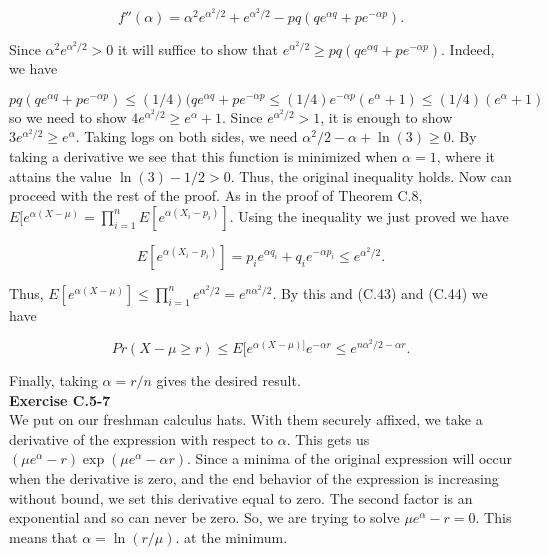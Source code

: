 \documentclass{article}
\begin{document}
\[ f''(\alpha) = \alpha^2e^{\alpha^2/2} + e^{\alpha^2/2} - pq(qe^{\alpha q} + pe^{-\alpha p}).\]

Since $ \alpha^2e^{\alpha^2/2} > 0$ it will suffice to show that $e^{\alpha^2/2} \geq pq(qe^{\alpha q} + pe^{-\alpha p})$.  Indeed, we have

\[pq(qe^{\alpha q} + pe^{-\alpha p}) \leq (1/4)(qe^{\alpha q} + pe^{-\alpha p} \leq (1/4)e^{-\alpha p}(e^\alpha + 1) \leq (1/4)(e^\alpha + 1)\]
so we need to show $4e^{\alpha^2/2} \geq e^{\alpha} + 1$.  Since $e^{\alpha^2/2} > 1$, it is enough to show $3e^{\alpha^2/2} \geq e^{\alpha}$.  Taking logs on both sides, we need $\alpha^2/2 - \alpha + \ln(3) \geq 0$.  By taking a derivative we see that this function is minimized when $\alpha = 1$, where it attains the value $\ln(3)-1/2 > 0$.  Thus, the original inequality holds.  Now can proceed with the rest of the proof.  As in the proof of Theorem C.8, $E[e^{\alpha(X-\mu)} = \prod_{i=1}^n E[e^{\alpha(X_i-p_i)}]$.  Using the inequality we just proved we have 

\[ E[e^{\alpha(X_i-p_i)}] = p_ie^{\alpha q_i} + q_ie^{-\alpha p_i} \leq e^{\alpha^2/2}.\]

Thus, $E[e^{\alpha(X-\mu)}] \leq \prod_{i=1}^n e^{\alpha^2/2} = e^{n\alpha^2/2}$.  By this and (C.43) and (C.44) we have 

\[Pr(X-\mu \geq r) \leq E[e^{\alpha(X-\mu)]}e^{-\alpha r} \leq e^{n \alpha^2/2 - \alpha r}.\]

Finally, taking $\alpha = r/n$ gives the desired result. \\

\noindent\textbf{Exercise C.5-7}\\

We put on our freshman calculus hats. With them securely affixed, we take a derivative of the expression with respect to $\alpha$. This gets us $(\mu e^{\alpha} - r)\exp(\mu e^{\alpha}- \alpha r)$. Since a minima of the original expression will occur when the derivative is zero, and the end behavior of the expression is increasing without bound, we set this derivative equal to zero. The second factor is an exponential and so can never be zero. So, we are trying to solve $\mu e^{\alpha} - r = 0$. This means that $\alpha = \ln(r/\mu)$. at the minimum.\\
\end{document}
